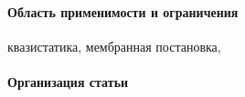 
\paragraph{Область применимости и ограничения}
квазистатика, мембранная постановка, 

\paragraph{Организация статьи}


